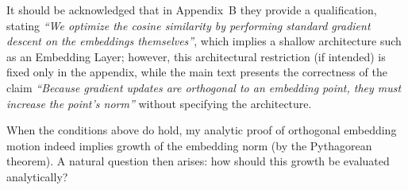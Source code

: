 It should be acknowledged that in Appendix~B they provide a qualification, stating \emph{``We optimize the cosine similarity by performing standard gradient descent on the embeddings themselves''}, which implies a shallow architecture such as an Embedding Layer; however, this architectural restriction (if intended) is fixed only in the appendix, while the main text presents the correctness of the claim \emph{``Because gradient updates are orthogonal to an embedding point, they must increase the point’s norm''} without specifying the architecture.

When the conditions above do hold, my analytic proof of orthogonal embedding motion indeed implies growth of the embedding norm (by the Pythagorean theorem). A natural question then arises: how should this growth be evaluated analytically?


